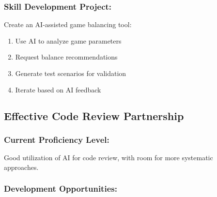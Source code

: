 \documentclass[12pt,a4paper]{article}
\begin{document}
\subsubsection*{Skill Development Project:}

Create an AI-assisted game balancing tool:
\begin{enumerate}
    \item Use AI to analyze game parameters
    \item Request balance recommendations
    \item Generate test scenarios for validation
    \item Iterate based on AI feedback
\end{enumerate}

\subsection{Effective Code Review Partnership}

\subsubsection*{Current Proficiency Level:}
Good utilization of AI for code review, with room for more systematic approaches.

\subsubsection*{Development Opportunities:}
\end{document}
